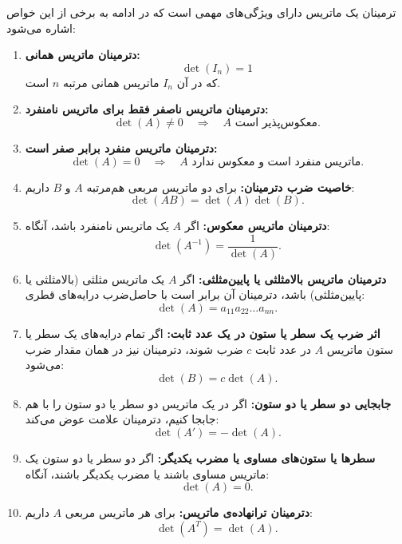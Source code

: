 \begin{nokteh}
	ترمینان یک ماتریس دارای ویژگی‌های مهمی است که در ادامه به برخی از این خواص اشاره می‌شود:
\begin{enumerate}
	\item \textbf{دترمینان ماتریس همانی:} 
	\[
	\det(I_n) = 1
	\]
	که در آن $I_n$ ماتریس همانی مرتبه $n$ است.
	
	\item \textbf{دترمینان ماتریس ناصفر فقط برای ماتریس نامنفرد:}
	\[
	\det(A) \neq 0 \quad \Rightarrow \quad A \text{ معکوس‌پذیر است.}
	\]
	
	\item \textbf{دترمینان ماتریس منفرد برابر صفر است:}
	\[
	\det(A) = 0 \quad \Rightarrow \quad A \text{ ماتریس منفرد است و معکوس ندارد.}
	\]
	
	\item \textbf{خاصیت ضرب دترمینان:}
	برای دو ماتریس مربعی هم‌مرتبه $A$ و $B$ داریم:
	\[
	\det(AB) = \det(A) \det(B).
	\]
	
	\item \textbf{دترمینان ماتریس معکوس:}
	اگر $A$ یک ماتریس نامنفرد باشد، آنگاه:
	\[
	\det(A^{-1}) = \frac{1}{\det(A)}.
	\]
	
	\item \textbf{دترمینان ماتریس بالامثلثی یا پایین‌مثلثی:}
	اگر $A$ یک ماتریس مثلثی (بالامثلثی یا پایین‌مثلثی) باشد، دترمینان آن برابر است با حاصل‌ضرب درایه‌های قطری:
	\[
	\det(A) = a_{11} a_{22} \dots a_{nn}.
	\]
	
	\item \textbf{اثر ضرب یک سطر یا ستون در یک عدد ثابت:}
	اگر تمام درایه‌های یک سطر یا ستون ماتریس $A$ در عدد ثابت $c$ ضرب شوند، دترمینان نیز در همان مقدار ضرب می‌شود:
	\[
	\det(B) = c \det(A).
	\]
	
	\item \textbf{جابجایی دو سطر یا دو ستون:}
	اگر در یک ماتریس دو سطر یا دو ستون را با هم جابجا کنیم، دترمینان علامت عوض می‌کند:
	\[
	\det(A') = -\det(A).
	\]
	
	\item \textbf{سطرها یا ستون‌های مساوی یا مضرب یکدیگر:}
	اگر دو سطر یا دو ستون یک ماتریس مساوی باشند یا مضرب یکدیگر باشند، آنگاه:
	\[
	\det(A) = 0.
	\]
	
	\item \textbf{دترمینان ترانهاده‌ی ماتریس:}
	برای هر ماتریس مربعی $A$ داریم:
	\[
	\det(A^T) = \det(A).
	\]
	
\end{enumerate}		
\end{nokteh}

